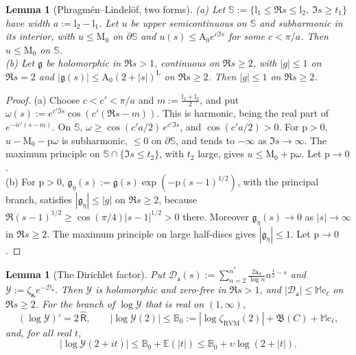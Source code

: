 \documentclass[11pt,reqno]{amsart}
\numberwithin{equation}{section}
\theoremstyle{plain}
\newtheorem{lemma}[theorem]{Lemma}
\theoremstyle{definition}
\theoremstyle{remark}
\newcommand{\RVM}{\mathrm{RVM}}
\begin{document}
\begin{lemma}[Phragm\'en--Lindel\"of, two forms]\label{lem:rb-PL}
\textup{(a)} Let $\mathbb S:=\{\mathrm l_1\le\Re s\le\mathrm l_2,\ \Im s\ge t_1\}$ have width $a:=\mathrm l_2-\mathrm l_1$. Let $u$ be upper semicontinuous on $\mathbb S$ and subharmonic in its interior, with $u\le \mathrm M_0$ on $\partial\mathbb S$ and $u(s)\le \mathrm A_0e^{c\Im s}$ for some $c<\pi/a$. Then $u\le \mathrm M_0$ on $\mathbb S$.\\
\textup{(b)} Let $\mathfrak g$ be holomorphic in $\Re s>1$, continuous on $\Re s\ge2$, with $|g|\le1$ on $\Re s=2$ and $|\mathfrak g(s)|\le \mathrm A_0(2+|s|)^{\mathrm L}$ on $\Re s\ge2$. Then $|g|\le1$ on $\Re s\ge2$.
\end{lemma}

\begin{proof}
(a) Choose $c<c'<\pi/a$ and $m:=\frac{\mathrm l_1+\mathrm l_2}2$, and put $\omega(s):=e^{c'\Im s}\cos(c'(\Re s-m))$. This is harmonic, being the real part of $e^{-ic'(s-m)}$. On $\mathbb S$, $\omega\ge\cos(c'a/2)\,e^{c'\Im s}$, and $\cos(c'a/2)>0$. For $\mathrm p>0$, $u-\mathrm M_0-\mathrm p\omega$ is subharmonic, $\le0$ on $\partial\mathbb S$, and tends to $-\infty$ as $\Im s\to\infty$. The maximum principle on $\mathbb S\cap\{\Im s\le t_2\}$, with $t_2$ large, gives $u\le \mathrm M_0+\mathrm p\omega$. Let $\mathrm p\to0$.\\
(b) For $\mathrm p>0$, $\mathfrak g_\eta(s):=\mathfrak g(s)\exp(-\mathrm p(s-1)^{1/2})$, with the principal branch, satisfies $|\mathfrak g_\eta|\le|g|$ on $\Re s\ge2$, because $\Re(s-1)^{1/2}\ge\cos(\pi/4)|s-1|^{1/2}>0$ there. Moreover $\mathfrak g_\eta(s)\to0$ as $|s|\to\infty$ in $\Re s\ge2$. The maximum principle on large half-discs gives $|\mathfrak g_\eta|\le1$. Let $\mathrm p\to0$.
\end{proof}

\begin{lemma}[The Dirichlet factor]\label{lem:rb-factor}
Put $\mathcal D_{\mathsf a}(s):=\sum_{n=2}^{n^*}\frac{2\mathsf a_n}{\log n}n^{\frac12-s}$ and $\mathcal Y:=\zeta_{\boldsymbol\kappa}e^{-\mathcal D_{\mathsf a}}$. Then $\mathcal Y$ is holomorphic and zero-free in $\Re s>1$, and $|\mathcal D_{\mathsf a}|\le \mathbb M\mathrm c_\ell$ on $\Re s\ge2$. For the branch of $\log \mathcal Y$ that is real on $(1,\infty)$,
\begin{equation}\label{eq:rb-logY-deriv}
 (\log \mathcal Y)'=2\,\widehat{\mathsf R},\qquad
 |\log \mathcal Y(2)|\le \mathbb B_0:=|\log\zeta_{\RVM}(2)|+\mathfrak B(C)+\mathbb M\mathrm c_\ell,
\end{equation}
and, for all real $t$,
\begin{equation}\label{eq:rb-line}
 |\log \mathcal Y(2+it)|\le \mathbb B_0+\mathbb E(|t|)\le \mathbb B_0+\upsilon\log(2+|t|).
\end{equation}
\end{lemma}
\end{document}
